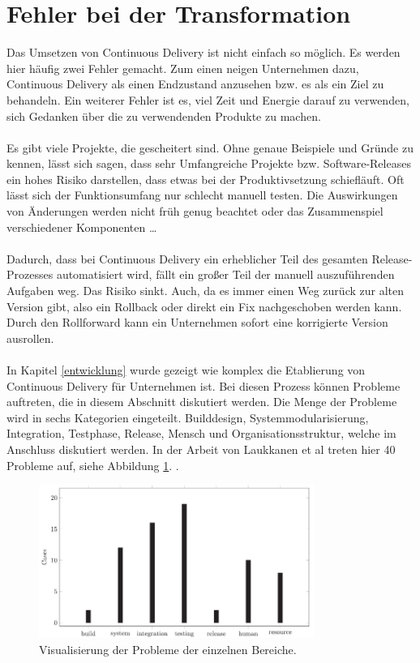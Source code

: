 \section{Fehler bei der Transformation} \label{Fehler bei der Transformation}

Das Umsetzen von Continuous Delivery ist nicht einfach so möglich. Es werden hier häufig zwei Fehler gemacht. Zum einen neigen Unternehmen dazu, Continuous Delivery als einen Endzustand anzusehen bzw. es als ein Ziel zu behandeln. Ein weiterer Fehler ist es, viel Zeit und Energie darauf zu verwenden, sich Gedanken über die zu verwendenden Produkte zu machen.\\ \\Es gibt viele Projekte, die gescheitert sind. Ohne genaue Beispiele und Gründe zu kennen, lässt sich sagen, dass sehr Umfangreiche Projekte bzw. Software-Releases ein hohes Risiko darstellen, dass etwas bei der Produktivsetzung schiefläuft. Oft lässt sich der Funktionsumfang nur schlecht manuell testen. Die Auswirkungen von Änderungen werden nicht früh genug beachtet oder das Zusammenspiel verschiedener Komponenten …\\ \\Dadurch, dass bei Continuous Delivery ein erheblicher Teil des gesamten Release-Prozesses automatisiert wird, fällt ein großer Teil der manuell auszuführenden Aufgaben weg. Das Risiko sinkt. Auch, da es immer einen Weg zurück zur alten Version gibt, also ein Rollback oder direkt ein Fix nachgeschoben werden kann. Durch den Rollforward kann ein Unternehmen sofort eine korrigierte Version ausrollen.\\ \\In Kapitel \ref{entwicklung} wurde gezeigt wie komplex die Etablierung von Continuous Delivery für Unternehmen ist. Bei diesen Prozess können Probleme auftreten, die in diesem Abschnitt diskutiert werden. Die Menge der Probleme wird in sechs Kategorien eingeteilt. Builddesign, Systemmodularisierung, Integration, Testphase, Release, Mensch und Organisationsstruktur, welche im Anschluss diskutiert werden. In der Arbeit von Laukkanen et al treten hier 40 Probleme auf, siehe Abbildung \ref{studie}. \cite{Laukkanen.2017}.

\begin{figure}[ht]
	\centering
	\includegraphics[width=0.8\textwidth,]{images/Transformationproblems}
	\caption{Visualisierung der Probleme der einzelnen Bereiche\cite{Laukkanen.2017}.}
	\label{studie}
\end{figure}

